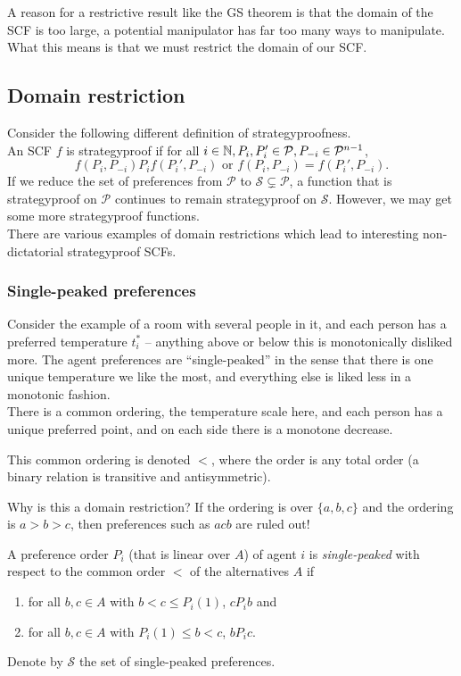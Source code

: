 	A reason for a restrictive result like the GS theorem is that the domain of the SCF is too large, a potential manipulator has far too many ways to manipulate.\\
	What this means is that we must restrict the domain of our SCF.

\subsection{Domain restriction}

	Consider the following different definition of strategyproofness.\\
	An SCF $f$ is strategyproof if for all $i \in \mathbb{N}, P_i,P_i' \in \mathcal{P}, P_{-i} \in \mathcal{P}^{n-1}$,
	\[ f(P_i,P_{-i}) P_i f(P_i',P_{-i}) \text{ or } f(P_i,P_{-i}) = f(P_i',P_{-i}). \]
	If we reduce the set of preferences from $\mathcal{P}$ to $\mathcal{S} \subsetneq \mathcal{P}$, a function that is strategyproof on $\mathcal{P}$ continues to remain strategyproof on $\mathcal{S}$. However, we may get some more strategyproof functions.\\

	There are various examples of domain restrictions which lead to interesting non-dictatorial strategyproof SCFs.

	\subsubsection{Single-peaked preferences}
		Consider the example of a room with several people in it, and each person has a preferred temperature $t_i^*$ -- anything above or below this is monotonically disliked more. The agent preferences are ``single-peaked'' in the sense that there is one unique temperature we like the most, and everything else is liked less in a monotonic fashion.\\
		There is a common ordering, the temperature scale here, and each person has a unique preferred point, and on each side there is a monotone decrease. %

		This common ordering is denoted $<$, where the order is any total order (a binary relation is transitive and antisymmetric).

		Why is this a domain restriction? If the ordering is over $\{a,b,c\}$ and the ordering is $a>b>c$, then preferences such as $acb$ are ruled out!

		\begin{fdef}
			A preference order $P_i$ (that is linear over $A$) of agent $i$ is \emph{single-peaked} with respect to the common order $<$ of the alternatives $A$ if
			\begin{enumerate}
				\item for all $b,c \in A$ with $b < c \le P_i(1)$, $c P_i b$ and
				\item for all $b,c \in A$ with $P_i(1) \le b < c$, $b P_i c$.
			\end{enumerate}
			Denote by $\mathcal{S}$ the set of single-peaked preferences.
		\end{fdef}

